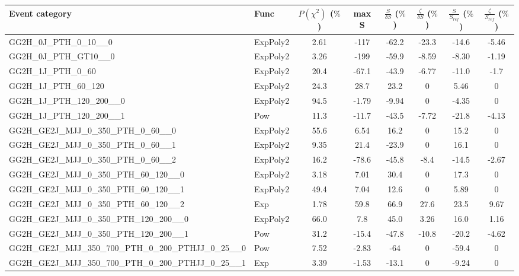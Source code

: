 \begin{table}[!h]
   \centering  \scriptsize
    \begin{adjustbox}{width={\textwidth},totalheight={\textheight},keepaspectratio}
    \begin{tabular}{llcccccc}
    \hline
    \hline
    Event category               & Func  &  $P(\chi^2)$ ($\%$) & max S  & $\frac{S}{\delta S}$ ($\%$)  &  $\frac{\zeta}{\delta S}$ ($\%$)   & $\frac{S}{S_{ref}}$ ($\%$) & $\frac{\zeta}{S_{ref}}$ ($\%$)  \\ \hline
    \hline
GG2H\_0J\_PTH\_0\_10\_\_0 & ExpPoly2 & 2.61 & -117 & -62.2 & -23.3 & -14.6 & -5.46 \\
GG2H\_0J\_PTH\_GT10\_\_0 & ExpPoly2 & 3.26 & -199 & -59.9 & -8.59 & -8.30 & -1.19 \\
GG2H\_1J\_PTH\_0\_60 & ExpPoly2 & 20.4 & -67.1 & -43.9 & -6.77 & -11.0 & -1.7 \\
GG2H\_1J\_PTH\_60\_120 & ExpPoly2 & 24.3 & 28.7 & 23.2 & 0 & 5.46 & 0 \\
GG2H\_1J\_PTH\_120\_200\_\_0 & ExpPoly2 & 94.5 & -1.79 & -9.94 & 0 & -4.35 & 0 \\
GG2H\_1J\_PTH\_120\_200\_\_1 & Pow & 11.3 & -11.7 & -43.5 & -7.72 & -21.8 & -4.13 \\
GG2H\_GE2J\_MJJ\_0\_350\_PTH\_0\_60\_\_0 & ExpPoly2 & 55.6 & 6.54 & 16.2 & 0 & 15.2 & 0 \\
GG2H\_GE2J\_MJJ\_0\_350\_PTH\_0\_60\_\_1 & ExpPoly2 & 9.35 & 21.4 & -23.9 & 0 & 16.1 & 0 \\
 GG2H\_GE2J\_MJJ\_0\_350\_PTH\_0\_60\_\_2 & ExpPoly2 & 16.2 & -78.6 & -45.8 & -8.4 & -14.5 & -2.67 \\
 GG2H\_GE2J\_MJJ\_0\_350\_PTH\_60\_120\_\_0 & ExpPoly2 & 3.18 & 7.01 & 30.4 & 0 & 17.3 & 0\\
 GG2H\_GE2J\_MJJ\_0\_350\_PTH\_60\_120\_\_1 & ExpPoly2 & 49.4 & 7.04 & 12.6 & 0 & 5.89 & 0\\
 GG2H\_GE2J\_MJJ\_0\_350\_PTH\_60\_120\_\_2 & Exp & 1.78 & 59.8 & 66.9 & 27.6 & 23.5 & 9.67 \\
 GG2H\_GE2J\_MJJ\_0\_350\_PTH\_120\_200\_\_0 & ExpPoly2 & 66.0 & 7.8 & 45.0 & 3.26 & 16.0 & 1.16 \\
 GG2H\_GE2J\_MJJ\_0\_350\_PTH\_120\_200\_\_1 & Pow & 31.2 & -15.4 & -47.8 & -10.8 & -20.2 & -4.62 \\
 GG2H\_GE2J\_MJJ\_350\_700\_PTH\_0\_200\_PTHJJ\_0\_25\_\_0 & Pow & 7.52 & -2.83 & -64 & 0 & -59.4 & 0 \\
 GG2H\_GE2J\_MJJ\_350\_700\_PTH\_0\_200\_PTHJJ\_0\_25\_\_1 & Exp & 3.39 & -1.53 & -13.1 & 0 & -9.24 & 0\\

\end{tabular}
\end{adjustbox}
\end{table}
